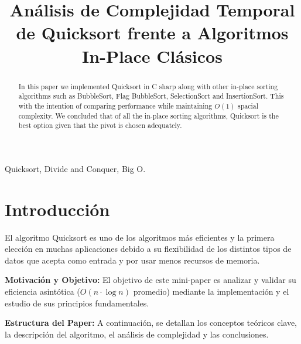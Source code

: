 \documentclass[conference]{IEEEtran}
\begin{document}
\title{Análisis de Complejidad Temporal de Quicksort frente a Algoritmos In-Place Clásicos}

\author{
\and
{}
}

\maketitle

\begin{abstract}
In this paper we implemented Quicksort in C sharp along with other in-place sorting algorithms such as BubbleSort, Flag BubbleSort, SelectionSort and InsertionSort.
This with the intention of comparing performance while maintaining $O(1)$ spacial complexity.
We concluded that of all the in-place sorting algorithms, Quicksort is the best option given that the pivot is chosen adequately.
\end{abstract}

\begin{IEEEkeywords}
Quicksort, Divide and Conquer, Big O.
\end{IEEEkeywords}


\section{Introducción}

El algoritmo Quicksort es uno de los algoritmos más eficientes y la 
primera elección en muchas aplicaciones debido a su flexibilidad de los distintos tipos de datos que acepta como entrada y por usar menos recursos de memoria.\par
\textbf{Motivación y Objetivo:} El objetivo de este mini-paper es analizar y validar su eficiencia asintótica ($O(n\cdot \log{n})$ promedio) mediante la implementación y el estudio de sus principios fundamentales.\par   
\textbf{Estructura del Paper:} A continuación, se detallan los conceptos teóricos clave, la descripción del algoritmo, el análisis de complejidad y las conclusiones.
\end{document}
